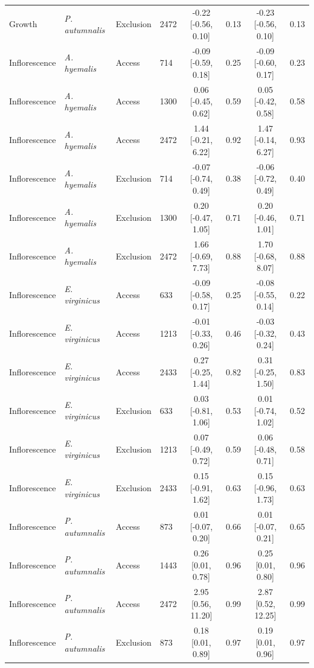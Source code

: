 \begin{landscape}
\begin{longtable}{llllcccc}
  Growth & \textit{P. autumnalis} & Exclusion & 2472 & -0.22 [-0.56, 0.10] & 0.13 & -0.23 [-0.56, 0.10] & 0.13 \\
  Inflorescence & \textit{A. hyemalis} & Access & 714 & -0.09 [-0.59, 0.18] & 0.25 & -0.09 [-0.60, 0.17] & 0.23 \\
  Inflorescence & \textit{A. hyemalis} & Access & 1300 & 0.06 [-0.45, 0.62] & 0.59 & 0.05 [-0.42, 0.58] & 0.58 \\
  Inflorescence & \textit{A. hyemalis} & Access & 2472 & 1.44 [-0.21, 6.22] & 0.92 & 1.47 [-0.14, 6.27] & 0.93 \\
  Inflorescence & \textit{A. hyemalis} & Exclusion & 714 & -0.07 [-0.74, 0.49] & 0.38 & -0.06 [-0.72, 0.49] & 0.40 \\
  Inflorescence & \textit{A. hyemalis} & Exclusion & 1300 & 0.20 [-0.47, 1.05] & 0.71 & 0.20 [-0.46, 1.01] & 0.71 \\
  Inflorescence & \textit{A. hyemalis} & Exclusion & 2472 & 1.66 [-0.69, 7.73] & 0.88 & 1.70 [-0.68, 8.07] & 0.88 \\
  Inflorescence & \textit{E. virginicus} & Access & 633 & -0.09 [-0.58, 0.17] & 0.25 & -0.08 [-0.55, 0.14] & 0.22 \\
  Inflorescence & \textit{E. virginicus} & Access & 1213 & -0.01 [-0.33, 0.26] & 0.46 & -0.03 [-0.32, 0.24] & 0.43 \\
  Inflorescence & \textit{E. virginicus} & Access & 2433 & 0.27 [-0.25, 1.44] & 0.82 & 0.31 [-0.25, 1.50] & 0.83 \\
  Inflorescence & \textit{E. virginicus} & Exclusion & 633 & 0.03 [-0.81, 1.06] & 0.53 & 0.01 [-0.74, 1.02] & 0.52 \\
  Inflorescence & \textit{E. virginicus} & Exclusion & 1213 & 0.07 [-0.49, 0.72] & 0.59 & 0.06 [-0.48, 0.71] & 0.58 \\
  Inflorescence & \textit{E. virginicus} & Exclusion & 2433 & 0.15 [-0.91, 1.62] & 0.63 & 0.15 [-0.96, 1.73] & 0.63 \\
  Inflorescence & \textit{P. autumnalis} & Access & 873 & 0.01 [-0.07, 0.20] & 0.66 & 0.01 [-0.07, 0.21] & 0.65 \\
  Inflorescence & \textit{P. autumnalis} & Access & 1443 & 0.26 [0.01, 0.78] & 0.96 & 0.25 [0.01, 0.80] & 0.96 \\
  Inflorescence & \textit{P. autumnalis} & Access & 2472 & 2.95 [0.56, 11.20] & 0.99 & 2.87 [0.52, 12.25] & 0.99 \\
  Inflorescence & \textit{P. autumnalis} & Exclusion & 873 & 0.18 [0.01, 0.89] & 0.97 & 0.19 [0.01, 0.96] & 0.97 \\

\end{longtable}
\end{landscape}

